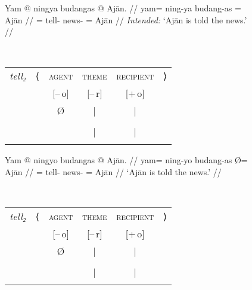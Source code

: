 \begin{figure}
\pex\label{ex:ditrpass}
\a\label{ex:ditrpass_pass1}%
\ljudge*\begin{minipage}[t]{.4\remaining}
\begingl
	\gla Yam @ ningya budangas {} @ Ajān. //
	\glb yam= ning-ya budang-as \Top= Ajān //
	\glc \DatT{}= tell-\TsgM{} news-\Parg{} \Top{}= Ajān //
	\glft \textit{Intended:} `Ajān is told the news.' //
\endgl
\end{minipage}
~
\begin{tabular}[t]{>{\itshape}l l c c c r}
tell₂
	& ⟨
	& \textsc{agent}
	& \textsc{theme}
	& \textsc{recipient}
	& ⟩
	\\
%
	& %
	& [–\,o]
	& [–\,r]
	& [+\,o]
	& %
	\\

%
	& %
	& Ø
	& |
	& |
	& %
	\\

%
	& %
	& %
	& \Obj
	& \Subj*
	& %
	\\

%
	& %
	& %
	& |
	& |
	& %
	\\

%
	& %
	& %
	& \fw{news}
	& \fw{Ajān}
	& %
	\\
\end{tabular}

\a\label{ex:ditrpass_pass2}%
\begin{minipage}[t]{.4\remaining}
\begingl
	\gla Yam @ ningyo budangas {} @ Ajān. //
	\glb yam= ning-yo budang-as Ø= Ajān //
	\glc \DatT{}= tell-\TsgN{} news-\Parg{} \Top{}= Ajān //
	\glft `Ajān is told the news.' //
\endgl
\end{minipage}
~
\begin{tabular}[t]{>{\itshape}l l c c c r}
tell₂
	& ⟨
	& \textsc{agent}
	& \textsc{theme}
	& \textsc{recipient}
	& ⟩
	\\
%
	& %
	& [–\,o]
	& [–\,r]
	& [+\,o]
	& %
	\\

%
	& %
	& Ø
	& |
	& |
	& %
	\\

%
	& %
	& %
	& \Subj
	& \SObj*
	& %
	\\

%
	& %
	& %
	& |
	& |
	& %
	\\

%
	& %
	& %
	& \fw{news}
	& \fw{Ajān}
	& %
	\\
\end{tabular}
\xe
\end{figure}

